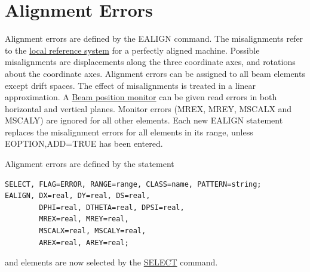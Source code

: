 
\section{Alignment Errors} %
Alignment errors are defined by the EALIGN command. The misalignments
refer to the \href{../Introduction/local_system.html}{local reference
  system} for a perfectly aligned machine. Possible misalignments are
displacements along the three coordinate axes, and rotations about the
coordinate axes. Alignment errors can be assigned to all beam elements
except drift spaces. The effect of misalignments is treated in a linear
approximation. A \href{read HREF=../Introduction/monitors.html}{Beam
  position monitor} can be given read errors in both horizontal and
vertical planes. Monitor errors (MREX, MREY, MSCALX and MSCALY) are
ignored for all other elements. Each new EALIGN statement replaces the
misalignment errors for all elements in its range, unless
EOPTION,ADD=TRUE has been entered.  

Alignment errors are defined by the statement 

\begin{verbatim}
SELECT, FLAG=ERROR, RANGE=range, CLASS=name, PATTERN=string;
EALIGN, DX=real, DY=real, DS=real, 
        DPHI=real, DTHETA=real, DPSI=real, 
        MREX=real, MREY=real,
        MSCALX=real, MSCALY=real,
        AREX=real, AREY=real;
\end{verbatim}
and elements are now selected by the
\href{../Introduction/select.html}{SELECT} command. 

